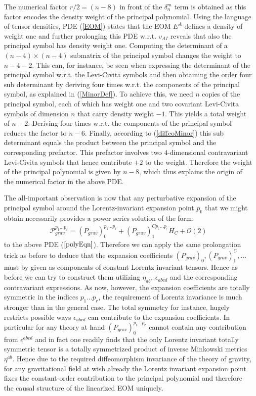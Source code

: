 The numerical factor $r/2 = (n-8)$ in front of the $\delta^m_n$ term is obtained as this factor encodes the density weight of the principal polynomial. Using the language of tensor densities, PDE (\ref{EOM}) states that the EOM $E^A$ defines a density of weight one and further prolonging this PDE w.r.t. $v_{AI}$ reveals that also the principal symbol has density weight one. Computing the determinant of a $(n-4) \times (n-4)$ submatrix of the principal symbol changes the weight to $n-4-2$. This can, for instance, be seen when expressing the determinant of the principal symbol w.r.t. the Levi-Civita symbols and then obtaining the order four sub determinant by deriving four times w.r.t. the components of the principal symbol, as explained in (\ref{MinorDef}). To achieve this, we need $n$ copies of the principal symbol, each of which has weight one and two covariant Levi-Civita symbols of dimension $n$ that carry density weight $-1$. This yields a total weight of $n-2$. Deriving four times w.r.t. the components of the principal symbol reduces the factor to $n-6$. Finally, according to (\ref{diffeoMinor}) this sub determinant equals the product between the principal symbol and the corresponding prefactor. This prefactor involves two $4$-dimensional contravariant Levi-Civita symbols that hence contribute $+2$ to the weight. Therefore the weight of the principal polynomial is given by $n-8$, which thus explains the origin of the numerical factor in the above PDE. 

The all-important observation is now that any perturbative expansion of the principal symbol around the Lorentz-invariant expansion point $p_0$ that we might obtain necessarily provides a power series solution of the form:
\begin{align}
    \mathcal{P}_{grav}^{{p_1}...{p_{r}}} = (P_{grav})^{{p_1}...{p_{r}}}_0 + (P_{grav})_1^{C{p_1}...{p_{r}}} H_C + \mathcal{O}(2)
\end{align}
to the above PDE ($\ref{polyEqn}$). Therefore we can apply the same prolongation trick as before to deduce that the expansion coefficients $(P_{grav})_0, (P_{grav})_1^C,...$ must by given as components of constant Lorentz invariant tensors. Hence as before we can try to construct them utilizing $\eta_{ab}$, $\epsilon_{abcd}$ and the corresponding contravariant expressions. As now, however, the expansion coefficients are totally symmetric in the indices $p_1...p_r$, the requirement of Lorentz invariance is much stronger than in the general case. The total symmetry for instance, hugely restricts possible ways $\epsilon_{abcd}$ can contribute to the expansion coefficients. In particular for any theory at hand $(P_{grav})_0^{{p_1}...{p_{r}}}$ cannot contain any contribution from $\epsilon^{abcd}$ and in fact one readily finds that the only Lorentz invariant totally symmetric tensor is a totally symmetrized product of inverse Minkowski metrics $\eta^{ab}$. Hence due to the required diffeomorphism invariance of the theory of gravity, for any gravitational field at wish already the Lorentz invariant expansion point fixes the constant-order contribution to the principal polynomial and therefore the causal structure of the linearized EOM uniquely.

